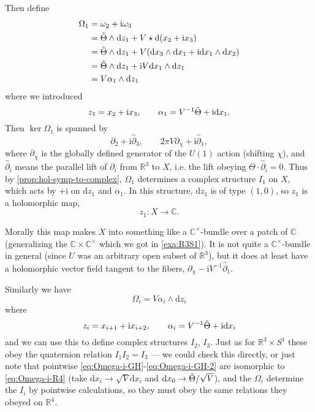 \documentclass[12pt,letterpaper,reqno]{article}
\numberwithin{equation}{section}
\newcommand{\R}{\ensuremath{\mathbb R}}
\newcommand{\C}{\ensuremath{\mathbb C}}
\newcommand{\I}{{\mathrm i}}
\newcommand{\de}{\mathrm{d}}
\begin{document}
\begin{example}
Then define
\begin{align}
  \Omega_1 &= \omega_2 + \I \omega_3 \\
  &= \tTheta \wedge \de z_1 +  V \star \de(x_2 + \I x_3)\\
  &= \tTheta \wedge \de z_1 +  V (\de x_3 \wedge \de x_1 + \I \de x_1 \wedge \de x_2)\\
  &= \tTheta \wedge \de z_1 + \I V \de x_1 \wedge \de z_1 \\
  &= V \alpha_1 \wedge \de z_1
\end{align}
where we introduced
\begin{equation} \label{eq:hol-forms-GH}
  z_1 = x_2 + \I x_3, \qquad
  \alpha_1 = V^{-1} \tTheta + \I \de x_1.
\end{equation}
Then $\ker \Omega_1$ is spanned by
\begin{equation} \label{eq:gibbons-hawking-01-vectors}
 \hat\partial_2 + \I \hat\partial_3, \qquad 2 \pi V \partial_\chi + \I \hat\partial_1,
\end{equation}
 where $\partial_\chi$
is the globally defined generator of the $U(1)$ action
(shifting $\chi$),  and $\hat \partial_i$ means
the parallel lift of $\partial_i$ from $\R^3$ to $X$, i.e. the lift
obeying $\Theta \cdot \hat\partial_i = 0$. Thus
by \autoref{prop:hol-symp-to-complex}, $\Omega_1$
determines a complex structure $I_1$ on $X$, which acts
by $+\I$ on $\de z_1$ and $\alpha_1$.
In this structure, $\de z_1$ is of type $(1,0)$, so
$z_1$ is a holomorphic map,
\begin{equation}
  z_1: X \to \C.
\end{equation}

Morally this map makes $X$ into something like
a $\C^\times$-bundle over a patch of $\C$ (generalizing
the $\C\times\C^\times$ which we got in \autoref{exa:R3S1}).
It is not quite a $\C^\times$-bundle in general
(since $U$ was an arbitrary open subset of $\R^3$),
but it does at least have
a holomorphic vector field tangent to the fibers,
$\partial_\chi - \I V^{-1} \hat \partial_1$.

Similarly we have
\begin{equation} \label{eq:Omega-i-GH}
  \Omega_i = V \alpha_i \wedge \de z_i
\end{equation}
where
\begin{equation} \label{eq:Omega-i-GH-2}
  z_i = x_{i+1} + \I x_{i+2}, \qquad \alpha_i = V^{-1} \tTheta + \I \de x_i
\end{equation}
and we can use this to define complex structures $I_2$, $I_3$.
Just as for $\R^3 \times S^1$ these obey the quaternion
relation $I_1 I_2 = I_3$ --- we could check this directly,
or just note that pointwise \eqref{eq:Omega-i-GH}-\eqref{eq:Omega-i-GH-2}
are isomorphic to \eqref{eq:Omega-i-R4}
(take $\de x_i \to \sqrt{V} \de x_i$ and $\de x_0 \to \tTheta / \sqrt{V}$),
and the $\Omega_i$ determine the $I_i$ by pointwise calculations,
so they must obey the same relations they obeyed on $\R^4$.


\end{example}
\end{document}
